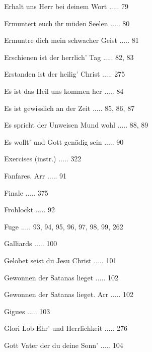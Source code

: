 \documentclass[twocolumn]{book}
\begin{document}
\newline 
Erhalt uns Herr bei deinem Wort ..... 79

\newline 
Ermuntert euch ihr müden Seelen ..... 80

\newline 
Ermuntre dich mein schwacher Geist ..... 81

\newline 
Erschienen ist der herrlich' Tag ..... 82, 83

\newline 
Erstanden ist der heilig' Christ ..... 275

\newline 
Es ist das Heil uns kommen her ..... 84

\newline 
Es ist gewisslich an der Zeit ..... 85, 86, 87

\newline 
Es spricht der Unweisen Mund wohl ..... 88, 89

\newline 
Es wollt' und Gott genädig sein ..... 90

\newline 
Exercises (instr.) ..... 322

\newline 
Fanfares. Arr ..... 91

\newline 
Finale ..... 375

\newline 
Frohlockt ..... 92

\newline 
Fuge ..... 93, 94, 95, 96, 97, 98, 99, 262

\newline 
Galliards ..... 100

\newline 
Gelobet seist du Jesu Christ ..... 101

\newline 
Gewonnen der Satanas lieget ..... 102

\newline 
Gewonnen der Satanas lieget. Arr ..... 102

\newline 
Gigues ..... 103

\newline 
Glori Lob Ehr' und Herrlichkeit ..... 276

\newline 
Gott Vater der du deine Sonn' ..... 104
\end{document}
